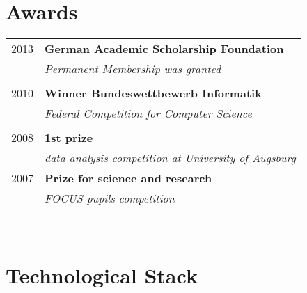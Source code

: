 \documentclass[a4paper,10pt]{article} %
\begin{document}
{\begin{minipage}[t]{0.44\textwidth}
\section{Awards}

\begin{tabular}{rl}
2013 & \textbf{German Academic Scholarship Foundation}\\
& \textit{Permanent Membership was granted}\\ \\


2010	 & \textbf{Winner Bundeswettbewerb Informatik}\\
& \textit{Federal Competition for Computer Science}\\ \\


2008	 & \textbf{1st prize}\\
& \textit{data analysis competition at University of Augsburg}\\[10pt]




2007	 & \textbf{Prize for science and research}\\
& \textit{FOCUS pupils competition}
\end{tabular}\\[10pt]


\section{Technological Stack}


\end{minipage}}
\end{document}

